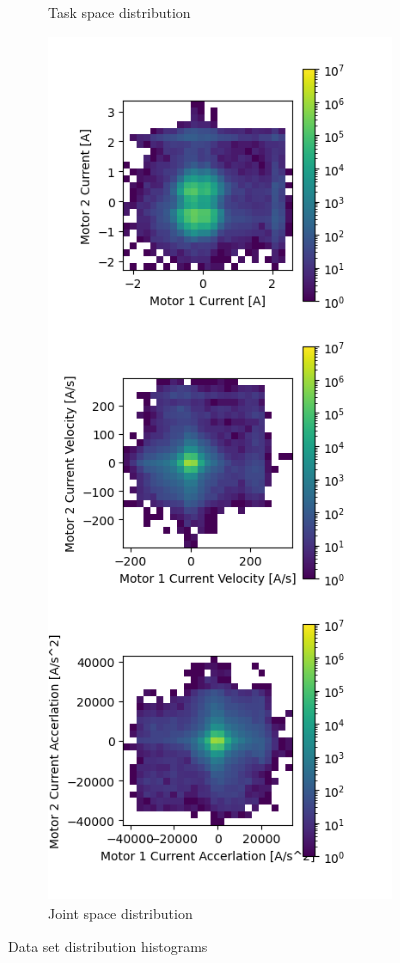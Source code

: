 \begin{figure}[h]
\begin{subfigure}[b]{0.48\textwidth}
         \caption{Task space distribution}
         \label{fig:dataset_dist_task}
     \end{subfigure}
     \hfill
     \begin{subfigure}[b]{0.48\textwidth}
         \centering
         \includegraphics[width=\textwidth]{images/dataset_distribution_joint.png}
         \caption{Joint space distribution}
         \label{fig:dataset_dist_joint}
     \end{subfigure}
        \caption{Data set distribution histograms}
        \label{fig:dataset_dist}
\end{figure}

